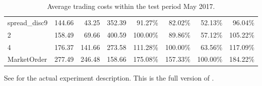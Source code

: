 \begin{table}[ht]
{\begin{tabular}{lRRR|RRRR}
spread\_disc9                 &    144.66 &   43.25 &  352.39 &   91.27\% &   82.02\% &   52.13\% &       96.04\% \\
2                            &    158.49 &   69.66 &  400.59 &  100.00\% &   89.86\% &   57.12\% &      105.22\% \\
4                            &    176.37 &  141.66 &  273.58 &  111.28\% &  100.00\% &   63.56\% &      117.09\% \\
MarketOrder                  &    277.49 &  246.48 &  158.66 &  175.08\% &  157.33\% &  100.00\% &      184.22\% \\
\bottomrule
\end{tabular}
}

        		\caption[Full version of ]{Average trading costs within the test period May 2017.}
		See  for the actual experiment description. This is the full version of .
		\label{tab:eval:additionalMarketVariables:fixed:fulltable}
\end{table}





















